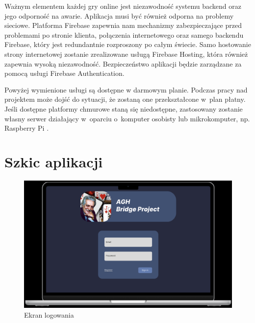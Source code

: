 Ważnym elementem każdej gry online jest niezawodność systemu
backend oraz jego odporność na awarie.
Aplikacja musi być również odporna na problemy sieciowe.
Platforma Firebase zapewnia nam mechanizmy zabezpieczające
przed problemami po stronie klienta, połączenia internetowego
oraz samego backendu Firebase, który jest redundantnie
rozproszony po całym świecie.
Samo hostowanie strony internetowej zostanie zrealizowane
usługą Firebase Hosting, która również zapewnia wysoką
niezawodność.
Bezpieczeństwo aplikacji będzie zarządzane za pomocą
usługi Firebase Authentication.

Powyżej wymienione usługi są dostępne w darmowym planie.
Podczas pracy nad projektem może dojść do sytuacji, że
zostaną one przekształcone w~plan płatny.
Jeśli dostępne platformy chmurowe staną się niedostępne,
zastosowany zostanie własny serwer działający
w~oparciu o~komputer osobisty lub mikrokomputer, np. Raspberry Pi \cite{RPi}.


\section{Szkic aplikacji}


\begin{figure}[h]
  \centering
  \includegraphics[width=\textwidth]{img/figma-szkic/1.png}
  \caption{Ekran logowania}
  \label{fig:figma_login}
\end{figure}

